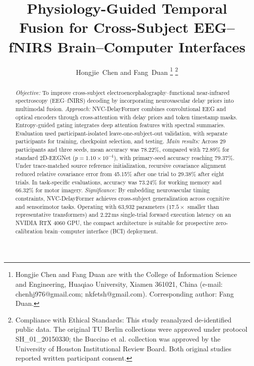 \documentclass[journal]{IEEEtran}
\begin{document}
\title{Physiology-Guided Temporal Fusion for Cross-Subject EEG--fNIRS Brain--Computer Interfaces}

\author{Hongjie~Chen and Fang~Duan%
\thanks{Hongjie Chen and Fang Duan are with the College of Information Science and Engineering, Huaqiao University, Xiamen 361021, China (e-mail: chenhj976@gmail.com; nkfetsh@gmail.com). Corresponding author: Fang Duan.}%
\thanks{Compliance with Ethical Standards: This study reanalyzed de-identified public data. The original TU Berlin collections were approved under protocol SH\_01\_20150330; the Buccino et al. collection was approved by the University of Houston Institutional Review Board. Both original studies reported written participant consent.}%
}


\maketitle

\begin{abstract}
\textit{Objective:} To improve cross-subject electro\-encephalo\-graphy--functional near-infrared spectroscopy (EEG--fNIRS) decoding by incorporating neurovascular delay priors into multimodal fusion.
\textit{Approach:} NVC-DelayFormer combines convolutional EEG and optical encoders through cross-attention with delay priors and token timestamp masks. Entropy-guided gating integrates deep attention features with spectral summaries. Evaluation used participant-isolated leave-one-subject-out validation, with separate participants for training, checkpoint selection, and testing.
\textit{Main results:} Across 29 participants and three seeds, mean accuracy was 78.22\%, compared with 72.89\% for standard 2D-EEGNet ($p = 1.10\times 10^{-4}$), with primary-seed accuracy reaching 79.37\%. Under trace-matched source reference initialization, recursive covariance alignment reduced relative covariance error from 45.15\% after one trial to 29.38\% after eight trials. In task-specific evaluations, accuracy was 73.24\% for working memory and 66.32\% for motor imagery.
\textit{Significance:} By embedding neurovascular timing constraints, NVC-DelayFormer achieves cross-subject generalization across cognitive and sensorimotor tasks. Operating with 63,932 parameters ($17.5\times$ smaller than representative transformers) and 2.22\,ms single-trial forward execution latency on an NVIDIA RTX 4060 GPU, the compact architecture is suitable for prospective zero-calibration brain--computer interface (BCI) deployment.
\end{abstract}
\end{document}
